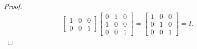 \documentclass{article}
\begin{document}
\begin{flushleft}
\begin{proof}
\begin{align*}
\begin{bmatrix}
					1 & 0 & 0 \\
					0 & 0 & 1
				\end{bmatrix}
				\begin{bmatrix}
					0 & 1 & 0 \\
					1 & 0 & 0 \\
					0 & 0 & 1
				\end{bmatrix}
				= \begin{bmatrix}
					1 & 0 & 0 \\
					0 & 1 & 0 \\
					0 & 0 & 1
				\end{bmatrix}
				= I.
			\end{align*}

		\end{proof}

	\end{flushleft}
\end{document}
